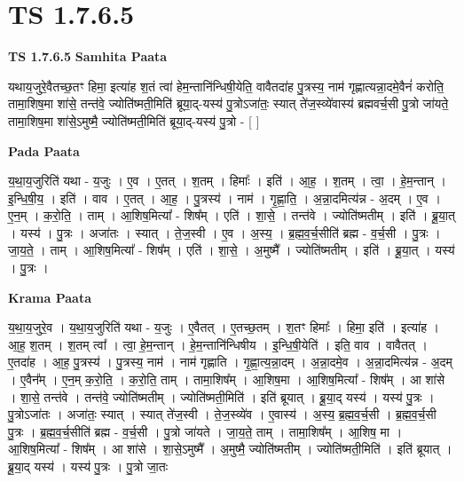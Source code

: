 \documentclass[17pt]{extarticle}
\begin{document}
\section*{ TS 1.7.6.5 }

\textbf{TS 1.7.6.5 } \newline
\textbf{Samhita Paata} \newline

यथाय॒जुरे॒वैतच्छ॒तꣳ हिमा॒ इत्या॑ह श॒तं त्वा॑ हेम॒न्तानि॑न्धिषी॒येति॒ वावैतदा॑ह पु॒त्रस्य॒ नाम॑ गृह्णात्यन्ना॒दमे॒वैनं॑ करोति॒ तामा॒शिष॒मा शा॑से॒ तन्त॑वे॒ ज्योति॑ष्मती॒मिति॑ ब्रूया॒द्-यस्य॑ पु॒त्रोऽजा॑तः॒ स्यात् ते॑ज॒स्व्ये॑वास्य॑ ब्रह्मवर्च॒सी पु॒त्रो जा॑यते॒ तामा॒शिष॒मा शा॑से॒ऽमुष्मै॒ ज्योति॑ष्मती॒मिति॑ ब्रूया॒द्-यस्य॑ पु॒त्रो - [ ] \newline

\textbf{Pada Paata} \newline

य॒था॒य॒जुरिति॑ यथा - य॒जुः । ए॒व । ए॒तत् । श॒तम् । हिमाः᳚ । इति॑ । आ॒ह॒ । श॒तम् । त्वा॒ । हे॒म॒न्तान् । इ॒न्धि॒षी॒य॒ । इति॑ । वाव । ए॒तत् । आ॒ह॒ । पु॒त्रस्य॑ । नाम॑ । गृ॒ह्णा॒ति॒ । अ॒न्ना॒दमित्य॑न्न - अ॒दम् । ए॒व । ए॒न॒म् । क॒रो॒ति॒ । ताम् । आ॒शिष॒मित्या᳚ - शिष᳚म् । एति॑ । शा॒से॒ । तन्त॑वे । ज्योति॑ष्मतीम् । इति॑ । ब्रू॒या॒त् । यस्य॑ । पु॒त्रः । अजा॑तः । स्यात् । ते॒ज॒स्वी । ए॒व । अ॒स्य॒ । ब्र॒ह्म॒व॒र्च॒सीति॑ ब्रह्म - व॒र्च॒सी । पु॒त्रः । जा॒य॒ते॒ । ताम् । आ॒शिष॒मित्या᳚ - शिष᳚म् । एति॑ । शा॒से॒ । अ॒मुष्मै᳚ । ज्योति॑ष्मतीम् । इति॑ । ब्रू॒या॒त् । यस्य॑ । पु॒त्रः ।  \newline


\textbf{Krama Paata} \newline

य॒था॒य॒जुरे॒व । य॒था॒य॒जुरिति॑ यथा - य॒जुः । ए॒वैतत् । ए॒तच्छ॒तम् । श॒तꣳ हिमाः᳚ । हिमा॒ इति॑ । इत्या॑ह । आ॒ह॒ श॒तम् । श॒तम् त्वा᳚ । त्वा॒ हे॒म॒न्तान् । हे॒म॒न्तानि॑न्धिषीय । इ॒न्धि॒षी॒येति॑ । इति॒ वाव । वावैतत् । ए॒तदा॑ह । आ॒ह॒ पु॒त्रस्य॑ । पु॒त्रस्य॒ नाम॑ । नाम॑ गृह्णाति । गृ॒ह्णा॒त्य॒न्ना॒दम् । अ॒न्ना॒दमे॒व । अ॒न्ना॒दमित्य॑न्न - अ॒दम् । ए॒वैन᳚म् । ए॒न॒म् क॒रो॒ति॒ । क॒रो॒ति॒ ताम् । तामा॒शिष᳚म् । आ॒शिष॒मा । आ॒शिष॒मित्या᳚ - शिष᳚म् । आ शा॑से । शा॒से॒ तन्त॑वे । तन्त॑वे॒ ज्योति॑ष्मतीम् । ज्योति॑ष्मती॒मिति॑ । इति॑ ब्रूयात् । ब्रू॒या॒द् यस्य॑ । यस्य॑ पु॒त्रः । पु॒त्रोऽजा॑तः । अजा॑तः॒ स्यात् । स्यात् ते॑ज॒स्वी । ते॒ज॒स्व्ये॑व । ए॒वास्य॑ । अ॒स्य॒ ब्र॒ह्म॒व॒र्च॒सी । ब्र॒ह्म॒व॒र्च॒सी पु॒त्रः । ब्र॒ह्म॒व॒र्च॒सीति॑ ब्रह्म - व॒र्च॒सी । पु॒त्रो जा॑यते । जा॒य॒ते॒ ताम् । तामा॒शिष᳚म् । आ॒शिष॒ मा । आ॒शिष॒मित्या᳚ - शिष᳚म् । आ शा॑से । शा॒से॒ऽमुष्मै᳚ । अ॒मुष्मै॒ ज्योति॑ष्मतीम् । ज्योति॑ष्मती॒मिति॑ । इति॑ ब्रूयात् । ब्रू॒या॒द् यस्य॑ । यस्य॑ पु॒त्रः । पु॒त्रो जा॒तः \newline
\end{document}
